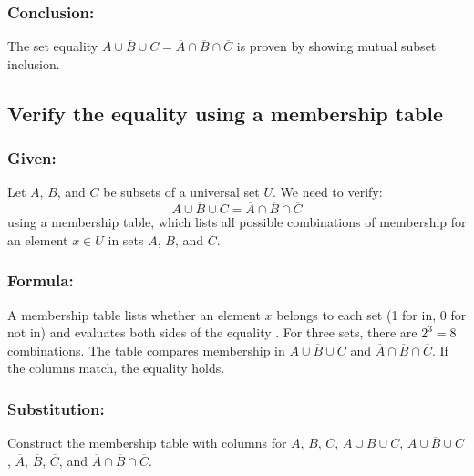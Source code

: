 \documentclass[12pt, a4paper, twoside]{report} %
\begin{document}
\subsubsection*{Conclusion:}
The set equality \( \overline{A \cup B \cup C} = \overline{A} \cap \overline{B} \cap \overline{C} \) is proven by showing mutual subset inclusion.

\subsection{Verify the equality using a membership table}

\subsubsection*{Given:}
Let \( A \), \( B \), and \( C \) be subsets of a universal set \( U \). We need to verify:
\[
\overline{A \cup B \cup C} = \overline{A} \cap \overline{B} \cap \overline{C}
\]
using a membership table, which lists all possible combinations of membership for an element \( x \in U \) in sets \( A \), \( B \), and \( C \).

\subsubsection*{Formula:}
A membership table lists whether an element \( x \) belongs to each set (1 for in, 0 for not in) and evaluates both sides of the equality \cite{rosen2019}. For three sets, there are \( 2^3 = 8 \) combinations. The table compares membership in \( \overline{A \cup B \cup C} \) and \( \overline{A} \cap \overline{B} \cap \overline{C} \). If the columns match, the equality holds.

\subsubsection*{Substitution:}
Construct the membership table with columns for \( A \), \( B \), \( C \), \( A \cup B \cup C \), \( \overline{A \cup B \cup C} \), \( \overline{A} \), \( \overline{B} \), \( \overline{C} \), and \( \overline{A} \cap \overline{B} \cap \overline{C} \).
\end{document}
